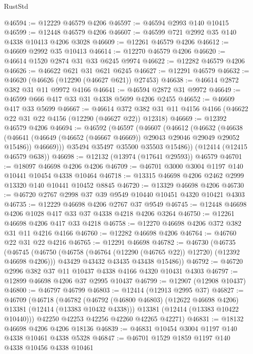 \begin{lexlean}{RustStd}
\begin{coremodule}
@46594 := @12229 @46579 @4206
@46597 := @46594 @2993 @140 @10415
@46599 := @12448 @46579 @4206
@46607 := @46599 @721 @2992 @35 @140 @4338 @10413 @4206 @3028
@46609 := @12261 @46579 @4206
@46612 := @46609 @2992 @35 @10413
@46614 := @12270 @46579 @4206
@46620 := @46614 @1520 @2874 @31 @33 @6245 @9974
@46622 := @12282 @46579 @4206
@46626 := @46622 @621 @31 @621 @6245
@46627 := @12291 @46579
@46632 := @46620 (@46626 (@12290 (@46627 @621)) @27453)
@46638 := @46614 @2872 @382 @31 @11 @9972 @4166
@46641 := @46594 @2872 @31 @9972
@46649 := @46599 @666 @417 @33 @31 @4338 @5699 @4206 @2455
@46652 := @46609 @417 @33 @5699
@46667 := @46614
    @372
    @382
    @31
    @11
    @4156
    @4166
    (@46622 @22 @31 @22 @4156 (@12290 (@46627 @22)) @12318)
@46669 := @12392 @46579 @4206
@46694 := @46592
    (@46597
      (@46607
        (@46612
          (@46632
            (@46638
              (@46641 (@46649 (@46652 (@46667 @46669)) @29043 @29046 @29049 @29052 @15486))
              @46669)))
        @35494
        @35497
        @35500
        @35503
        @15486))
    (@12414 (@12415 @46579 @638))
@46698 := @12132 (@13974 (@17641 @29593)) @46579
@46701 := @18097 @46698 @4206 @4206
@46709 := @46701 @3000 @3004 @1197 @140 @10441 @10454 @4338 @10464
@46718 := @13315 @46698 @4206 @2462 @2999 @13320 @140 @10441 @10452 @8845
@46720 := @13329 @46698 @4206
@46730 := @46720 @2767 @2998 @37 @39 @9549 @10440 @10451 @4320 @10421 @4303
@46735 := @12229 @46698 @4206 @2767 @37 @9549
@46745 := @12448 @46698 @4206 @1028 @417 @33 @37 @4338 @4218 @4206 @3264
@46750 := @12261 @46698 @4206 @417 @33 @4218
@46758 := @12270 @46698 @4206 @372 @382 @31 @11 @4216 @4166
@46760 := @12282 @46698 @4206
@46764 := @46760 @22 @31 @22 @4216
@46765 := @12291 @46698
@46782 := @46730
    (@46735
      (@46745
        (@46750 (@46758 (@46764 (@12290 (@46765 @22)) @12720) (@12392 @46698 @4206)))
        @43429
        @43432
        @43435
        @43438
        @15486))
@46792 := @46720 @2996 @382 @37 @11 @10437 @4338 @4166 @4320 @10431 @4303
@46797 := @12899 @46698 @4206 @37 @2995 @10437
@46799 := @12907 (@12908 @10437)
@46800 := @46797 @46799
@46803 := @12414 (@12913 @2995 @37)
@46827 := @46709
    (@46718
      (@46782
        (@46792 (@46800 @46803) (@12622 @46698 @4206) @13381 (@12414 (@13383 @10432 @4338)))
        @13381
        (@12414 (@13383 @10422 @10440)))
      @42250
      @42253
      @42256
      @42260
      @42265
      @42271)
@46831 := @18132 @46698 @4206 @4206 @18136
@46839 := @46831 @10454 @3004 @1197 @140 @4338 @10461 @4338 @5328
@46847 := @46701 @1529 @1859 @1197 @140 @4338 @10456 @4338 @10461

\end{coremodule}
\end{lexlean}
